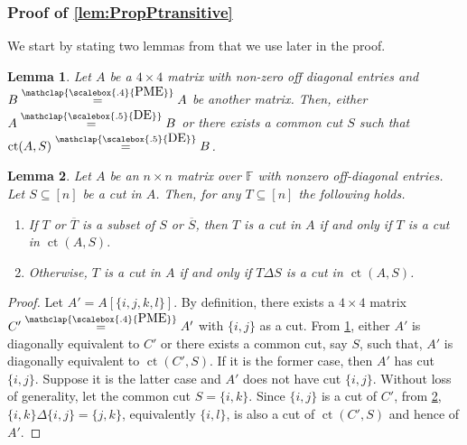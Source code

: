 \documentclass[11pt,letterpaper]{article}
\DeclareMathOperator*{\tw}{ct}
\newcommand{\comp}[1]{\overline{#1}}
\newcommand{\F}{\mathbb{F}}
\newtheorem{lemma}{Lemma}[section]
\newtheorem{observation}{Observation}[section]
\DeclareMathOperator{\calP}{\mathcal{P}}
\newcommand{\pp}[2]{\{\{#1\},\{#2\}\}}
\DeclareMathOperator*{\ct}{ct}
\newcommand{\DE}{\stackrel{\mathclap{\scalebox{.5}{\mbox{DE}}}}{=}}
\newcommand{\PME}{\stackrel{\mathclap{\scalebox{.4}{\mbox{PME}}}}{=}}
\begin{document}
{{{\subsubsection{Proof of \cref{lem:PropPtransitive}}
\label{subsec:PropPtransitive}
We start by stating two lemmas from \cite{Chatterjee25} that we use later in the proof. 
\begin{lemma}{\cite[Lemma 3.1]{Chatterjee25} }\label{lem:4PME}
    Let $A$ be a $4\times 4$ matrix with non-zero off diagonal entries and $B\PME A$ be another matrix. Then, either $A\DE B$ or there exists a common cut $S$ such that $\ct(A,S)\DE B$. 
\end{lemma}
\begin{lemma}{\cite[Lemma 3.2]{Chatterjee25}}
    \label{thm:cutmap}
Let $A$ be an $n\times n$ matrix over $\F$ with nonzero off-diagonal entries. Let $S\subseteq [n]$ be a cut in $A$. Then, for any $T\subseteq [n]$ the following holds.
\begin{enumerate}
\item If $T$ or $\comp{T}$ is a subset of $S$ or $\comp{S}$, then $T$ is a cut in $A$ if and only if $T$ is a cut in $\tw(A, S).$
\item Otherwise, $T$ is a cut in $A$ if and only if $T\Delta S$ is a cut in $\tw(A,S)$.
\end{enumerate}
\end{lemma}
    \begin{proof}
        Let $A'=A[\{i,j,k,l\}]$. By definition, there exists a $4\times 4$ matrix $C'\PME A' $ with $\{i,j\}$ as a cut. From \cref{lem:4PME}, either $A'$ is diagonally equivalent to $C'$ or there exists a common cut, say $S$, such that, $A'$ is diagonally equivalent to $\ct(C',S)$. If it is the former case, then $A'$ has cut $\{i,j\}$. Suppose it is the latter case and $A'$ does not have cut $\{i,j\}$. Without loss of generality, let the common cut $S=\{i,k\}$. Since $\{i,j\}$ is a cut of $C'$, from \cref{thm:cutmap}, $\{i,k\}\Delta\{i,j\}=\{j,k\}$, equivalently $\{i,l\}$, is also a cut of $\ct(C',S)$ and hence of $A'$.  

\end{proof}}}}
\end{document}

